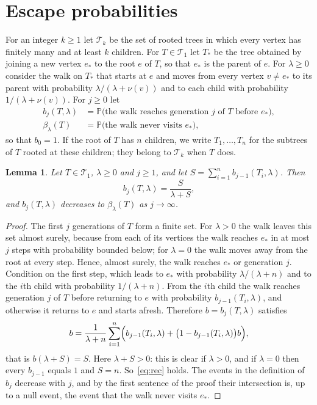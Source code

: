 \documentclass[11pt]{amsart}
\newtheorem{lemma}[theorem]{Lemma}
\theoremstyle{definition}
\newcommand{\Prob}{\mathbb{P}}
\newcommand{\cT}{\mathcal{T}}
\begin{document}
\section{Escape probabilities}\label{sec:escape}

For an integer $k\ge1$ let $\cT_k$ be the set of rooted trees in which every vertex has finitely many and at
least $k$ children. For $T\in\cT_1$ let $T_*$ be the tree obtained by joining a new vertex $e_*$ to the root $e$
of $T$, so that $e_*$ is the parent of $e$. For $\lambda\ge0$ consider the walk on $T_*$ that starts at $e$ and
moves from every vertex $v\ne e_*$ to its parent with probability $\lambda/(\lambda+\nu(v))$ and to each child
with probability $1/(\lambda+\nu(v))$. For $j\ge0$ let
\begin{align*}
   b_j(T,\lambda)&=\Prob\bigl(\text{the walk reaches generation $j$ of $T$ before $e_*$}\bigr),\\
   \beta_\lambda(T)&=\Prob\bigl(\text{the walk never visits $e_*$}\bigr),
\end{align*}
so that $b_0=1$. If the root of $T$ has $n$ children, we write $T_1,\dots,T_n$ for the subtrees of $T$ rooted at
these children; they belong to $\cT_k$ when $T$ does.

\begin{lemma}\label{lem:rec}
Let $T\in\cT_1$, $\lambda\ge0$ and $j\ge1$, and let $S=\sum_{i=1}^n b_{j-1}(T_i,\lambda)$. Then
\begin{equation}\label{eq:rec}
   b_j(T,\lambda)=\frac{S}{\lambda+S},
\end{equation}
and $b_j(T,\lambda)$ decreases to $\beta_\lambda(T)$ as $j\to\infty$.
\end{lemma}

\begin{proof}
The first $j$ generations of $T$ form a finite set. For $\lambda>0$ the walk leaves this set almost surely,
because from each of its vertices the walk reaches $e_*$ in at most $j$ steps with probability bounded below;
for $\lambda=0$ the walk moves away from the root at every step. Hence, almost surely, the walk reaches $e_*$ or
generation $j$. Condition on the first step, which leads to $e_*$ with probability $\lambda/(\lambda+n)$ and to
the $i$th child with probability $1/(\lambda+n)$. From the $i$th child the walk reaches generation $j$ of $T$
before returning to $e$ with probability $b_{j-1}(T_i,\lambda)$, and otherwise it returns to $e$ and starts
afresh. Therefore $b=b_j(T,\lambda)$ satisfies
\[
   b=\frac1{\lambda+n}\sum_{i=1}^n\Bigl(b_{j-1}(T_i,\lambda)+\bigl(1-b_{j-1}(T_i,\lambda)\bigr)b\Bigr),
\]
that is $b(\lambda+S)=S$. Here $\lambda+S>0$: this is clear if $\lambda>0$, and if $\lambda=0$ then every
$b_{j-1}$ equals $1$ and $S=n$. So~\eqref{eq:rec} holds. The events in the definition of $b_j$ decrease with $j$, and
by the first sentence of the proof their intersection is, up to a null event, the event that the walk never
visits $e_*$.
\end{proof}
\end{document}
